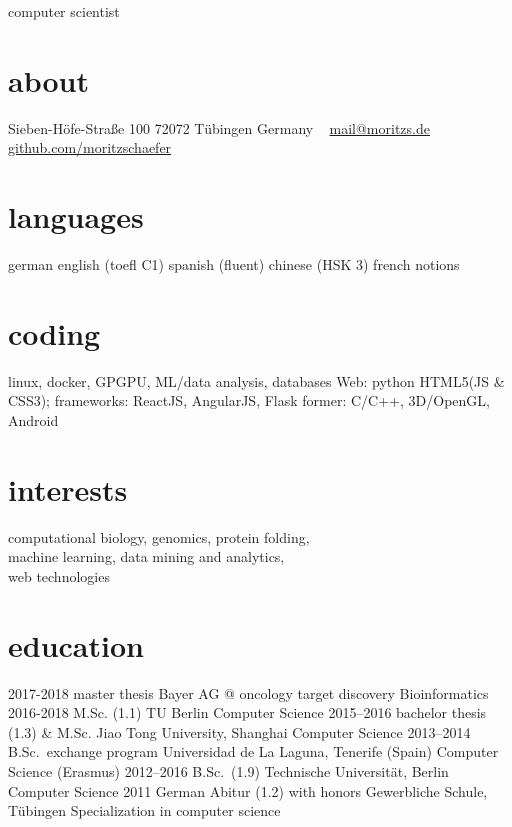 \documentclass[]{friggeri-cv}
\begin{document}
       {computer scientist}


\begin{aside}
  \section{about}
    Sieben-Höfe-Straße 100
    72072 Tübingen
    Germany
    ~
    \href{mailto:mail@moritz.de}{mail@moritzs.de}
    \href{https://github.com/moritzschaefer}{github.com/moritzschaefer}
  \section{languages}
    german
    english (toefl C1)
    spanish (fluent)
    chinese (HSK 3)
    french notions
  \section{coding}
    linux, docker, GPGPU, ML/data analysis, databases
    Web:
    python
    HTML5(JS \& CSS3); frameworks: ReactJS, AngularJS, Flask
    former:
    C/C++, 3D/OpenGL, Android
\end{aside}

\section{interests}

computational biology, genomics, protein folding, \\
machine learning, data mining and analytics, \\
web technologies%

\section{education}

\begin{entrylist}
  \entry
    {2017-2018}
    {master thesis}
    {Bayer AG @ oncology target discovery}
    {Bioinformatics}
  \entry
    {2016-2018}
    {M.Sc. (1.1)}
    {TU Berlin}
    {Computer Science}
  \entry
    {2015–2016}
    {bachelor thesis (1.3) \& M.Sc.}
    {Jiao Tong University, Shanghai}
    {Computer Science}
  \entry
    {2013–2014}
    {B.Sc.\ exchange program}
    {Universidad de La Laguna, Tenerife (Spain)}
    {Computer Science (Erasmus)}
  \entry
    {2012–2016}
    {B.Sc.\ (1.9)}
    {Technische Universität, Berlin}
    {Computer Science}
  \entry
    {2011}
    {German Abitur (1.2) with honors}
    {Gewerbliche Schule, Tübingen}
    {Specialization in computer science}
\end{entrylist}
\end{document}
